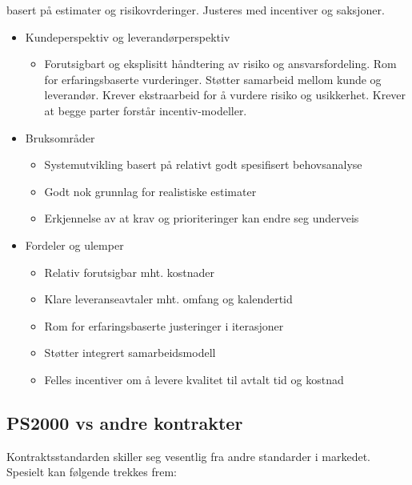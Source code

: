 \documentclass[11pt]{article}
\begin{document}
    basert på estimater og risikovrderinger. Justeres med incentiver og
    saksjoner.
\begin{itemize}
\item Kundeperspektiv og leverandørperspektiv

\begin{itemize}
\item Forutsigbart og eksplisitt håndtering av risiko og
        ansvarsfordeling. Rom for erfaringsbaserte vurderinger. Støtter samarbeid mellom kunde og
        leverandør. Krever ekstraarbeid for å vurdere risiko og usikkerhet. Krever at begge parter
        forstår incentiv-modeller.
\end{itemize}

\item Bruksområder

\begin{itemize}
\item Systemutvikling basert på relativt godt spesifisert behovsanalyse
\item Godt nok grunnlag for realistiske estimater
\item Erkjennelse av at krav og prioriteringer kan endre seg underveis
\end{itemize}

\item Fordeler og ulemper

\begin{itemize}
\item Relativ forutsigbar mht. kostnader
\item Klare leveranseavtaler mht. omfang og kalendertid
\item Rom for erfaringsbaserte justeringer i iterasjoner
\item Støtter integrert samarbeidsmodell
\item Felles incentiver om å levere kvalitet til avtalt tid og kostnad
\end{itemize}

\end{itemize}
\subsection{PS2000 vs andre kontrakter}
\label{sec-11.3}


   Kontraktsstandarden skiller seg vesentlig fra andre standarder i markedet. 
   Spesielt kan følgende trekkes frem: 
\end{document}
